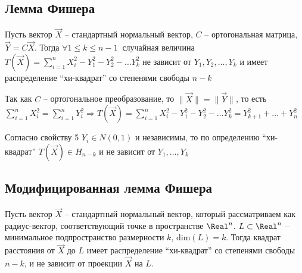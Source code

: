 \subsection{Лемма Фишера}

\hypertarget{fishers_lemma}{}

\begin{MyTheorem}
    Пусть вектор $\vec X$ -- стандартный нормальный вектор, $C$ -- ортогональная матрица, $\vec Y = C \vec X$.
    Тогда $\forall 1 \leq k \leq n - 1 \ $ случайная величина $T(\vec X) = \sum_{i = 1}^n X_i^2 - Y_1^2 - Y_2^2 - \dots Y_k^2$ 
    не зависит от $Y_1, Y_2, \dots, Y_k$ и имеет распределение \enquote{хи-квадрат} со степенями свободы $n - k$
\end{MyTheorem}

\begin{MyProof}
    Так как $C$ -- ортогональное преобразование, то $\|\vec X\| = \|\vec Y\|$, то есть $\sum_{i = 1}^n X^2_i = \sum_{i = 1}^n Y^2_i \Longrightarrow
    T(\vec X) = \sum_{i = 1}^n X_i^2 - Y_1^2 - Y_2^2 - \dots Y_k^2 = Y^2_{k + 1} + \dots + Y^2_{n}$

    Согласно свойству 5 $Y_i \in N(0, 1)$ и независимы, то по определению \enquote{хи-квадрат} $T(\vec X) \in H_{n - k}$ и не зависит от $Y_1, \dots, Y_k$
\end{MyProof}

\subsection{Модифицированная лемма Фишера}

\vspace{-2.5em}
\hfill \TagYTwoEight

\hypertarget{modified_fishers_lemma}{}

\begin{MyTheorem}
    Пусть вектор $\vec X$ -- стандартный нормальный вектор, который рассматриваем как радиус-вектор, 
    соответствующий точке в пространстве $\Real^n$. $L \subset \Real^n$ -- минимальное подпространство размерности $k$, 
    $\mathrm{dim}(L) = k$. Тогда квадрат расстояния от $\vec X$ до $L$ имеет распределение \enquote{хи-квадрат} со степенями свободы $n - k$,
    и не зависит от проекции $\vec X$ на $L$.
\end{MyTheorem}

